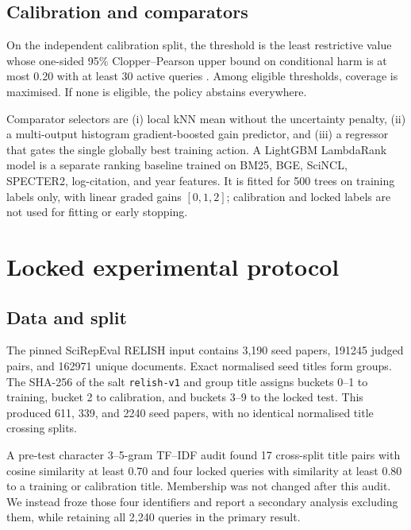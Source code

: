 \documentclass[11pt]{article}
\newcommand{\code}[1]{\texttt{#1}}
\newcommand{\TrainQueries}{611}
\newcommand{\CalibrationQueries}{339}
\newcommand{\TestQueries}{2240}
\newcommand{\CandidatePairs}{191245}
\newcommand{\UniqueDocuments}{162971}
\begin{document}
\subsection{Calibration and comparators}

On the independent calibration split, the threshold is the least restrictive value
whose one-sided 95\% Clopper--Pearson upper bound on conditional harm is at most
0.20 with at least 30 active queries \citep{clopper1934}.  Among eligible thresholds,
coverage is maximised.  If none is eligible, the policy abstains everywhere.

Comparator selectors are (i) local kNN mean without the uncertainty penalty,
(ii) a multi-output histogram gradient-boosted gain predictor, and (iii) a regressor
that gates the single globally best training action.  A LightGBM LambdaRank model
\citep{ke2017lightgbm} is a separate ranking baseline trained on BM25, BGE, SciNCL,
SPECTER2, log-citation, and year features.  It is fitted for 500 trees on training
labels only, with linear graded gains $[0,1,2]$; calibration and locked labels are
not used for fitting or early stopping.

\section{Locked experimental protocol}

\subsection{Data and split}

The pinned SciRepEval RELISH input contains 3,190 seed papers,
\CandidatePairs{} judged pairs, and
\UniqueDocuments{} unique documents.  Exact normalised seed titles form groups.
The SHA-256 of the salt \code{relish-v1} and group title assigns buckets 0--1 to training, bucket 2 to
calibration, and buckets 3--9 to the locked test.  This produced \TrainQueries{},
\CalibrationQueries{}, and \TestQueries{} seed papers, with no identical normalised
title crossing splits.

A pre-test character 3--5-gram TF--IDF audit found 17 cross-split title pairs with
cosine similarity at least 0.70 and four locked queries with similarity at least 0.80
to a training or calibration title.  Membership was not changed after this audit.  We
instead froze those four identifiers and report a secondary analysis excluding them,
while retaining all 2,240 queries in the primary result.
\end{document}

